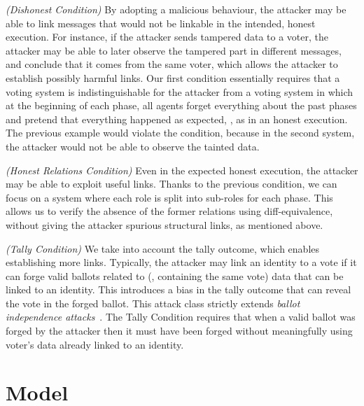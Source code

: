 \noindent
\textit{(Dishonest Condition)}
By adopting a malicious behaviour, the attacker may be able to link messages that would not be linkable in 
the intended, honest execution.
For instance, if the attacker sends tampered data to a voter, the
attacker may be able to later observe the tampered part in different
messages, and conclude that it comes from the same voter, which allows
the attacker to establish possibly harmful links.
Our first condition essentially requires that a voting system is indistinguishable for the attacker from a voting system
in which at the beginning of each phase, all agents forget everything
about the past phases
and pretend that everything happened
as expected, \ie, as in an honest execution.
The previous example would violate the condition, because in the second system, the attacker
would not be able to observe the tainted data.

\noindent
\textit{(Honest Relations Condition)}
Even in the expected honest execution, the attacker may be able to
exploit useful links. %
Thanks to the previous condition, 
we can focus on a system where each role is split into sub-roles for
each phase.
This allows us to verify the absence of the former relations using
diff-equivalence, without giving the attacker
spurious structural links, as mentioned above.

\noindent
\textit{(Tally Condition)}
We take into account the tally outcome, which enables establishing 
more links. Typically, the attacker may
link an identity to a vote if it can 
forge valid ballots related to (\ie, containing the same vote)
data that can be linked to an identity.
This introduces a bias in the tally outcome that can reveal 
the vote in the forged ballot.
This attack class strictly 
extends {\em ballot independence attacks}~\cite{cortier2013attacking}.
The Tally Condition requires that when a valid ballot was forged by the attacker
then it must have been forged without meaningfully using voter's data already
linked to an identity.

\section{Model}
\label{sec:background}
\label{sec:background:model}

